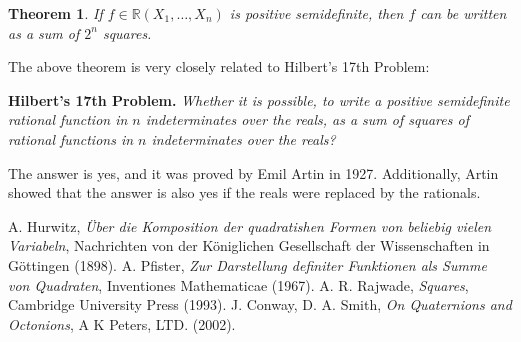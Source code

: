 \documentclass[12pt]{article}
\theoremstyle{theorem}
\newtheorem*{thm}{Theorem}
\begin{document}
\begin{thm}
If $f\in\mathbb{R}(X_1,\ldots,X_n)$ is positive semidefinite, then
$f$ can be written as a sum of $2^n$ squares.
\end{thm}

The above theorem is very closely related to Hilbert's 17th Problem:

{\textbf{Hilbert's 17th Problem.}} \emph{Whether it is possible, to
write a positive semidefinite rational function in $n$
indeterminates over the reals, as a sum of squares of rational
functions in $n$ indeterminates over the reals?}

The answer is yes, and it was proved by Emil Artin in 1927.
Additionally, Artin showed that the answer is also yes if the reals
were replaced by the rationals.


\begin{thebibliography}{8}
 A. Hurwitz, {\em \"{U}ber die Komposition der quadratishen Formen von beliebig vielen Variabeln}, Nachrichten von der K\"{o}niglichen Gesellschaft der Wissenschaften in G\"{o}ttingen (1898).
 A. Pfister, {\em Zur Darstellung definiter Funktionen als Summe von Quadraten}, Inventiones Mathematicae (1967).
 A. R. Rajwade, {\em Squares}, Cambridge University Press (1993).
 J. Conway, D. A. Smith, {\em On Quaternions and Octonions}, A K Peters, LTD. (2002).
\end{thebibliography}
\end{document}

